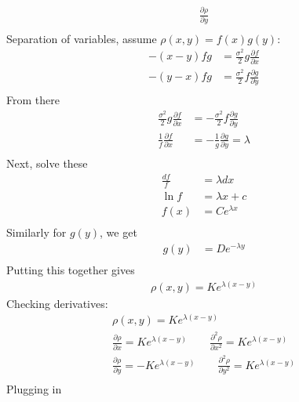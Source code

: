 \documentclass[12pt]{article}
\theoremstyle{plain}
\theoremstyle{definition}
\theoremstyle{remark}
\begin{document}
\begin{enumerate}
\begin{enumerate}
\begin{align*}
            \frac{\partial \rho}{\partial y} \\
        \end{align*}
        Separation of variables, assume $\rho(x,y) = f(x) g(y)$:
        \begin{align*}
          -(x-y)fg &= \frac{\sigma^2 }{2}
          g \frac{\partial f}{\partial x}\\
          -(y-x)fg &= \frac{\sigma^2 }{2}
            f \frac{\partial g}{\partial y} \\
        \end{align*}
        From there
        \begin{align*}
          \frac{\sigma^2 }{2} g \frac{\partial f}{\partial x}
            &= -\frac{\sigma^2 }{2} f \frac{\partial g}{\partial y} \\
          \frac{1}{f}\frac{\partial f}{\partial x}
            &= -\frac{1}{g} \frac{\partial g}{\partial y}
            = \lambda \\
        \end{align*}
        Next, solve these
        \begin{align*}
          \frac{d f}{f} &= \lambda dx\\
          \ln f &= \lambda x + c\\
          f(x) &= Ce^{\lambda x}\\
        \end{align*}
        Similarly for $g(y)$, we get
        \begin{align*}
          g(y) &= De^{-\lambda y}\\
        \end{align*}
        Putting this together gives
        \begin{align*}
          \rho(x,y) = K e^{\lambda (x-y)}
        \end{align*}
        Checking derivatives:
        \begin{align*}
          \rho(x,y) = K e^{\lambda (x-y)}\\
          \frac{\partial \rho}{\partial x} = K e^{\lambda (x-y)}
          \qquad
          \frac{\partial^2 \rho}{\partial x^2} = K e^{\lambda (x-y)}\\
          \frac{\partial \rho}{\partial y} = -K e^{\lambda (x-y)}
          \qquad
          \frac{\partial^2 \rho}{\partial y^2} = K e^{\lambda (x-y)}\\
        \end{align*}
        Plugging in
        \begin{align*}

\end{align*}
\end{enumerate}
\end{enumerate}
\end{document}
